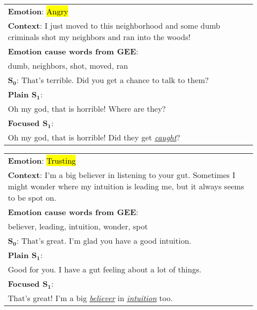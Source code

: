 \documentclass[11pt]{article}
\newcommand{\hlc}[2][yellow]{{\colorlet{foo}{#1}\sethlcolor{foo}\hl{#2}}}
\newcommand{\angry}[1]{\hlc[anger]{#1}}
\newcommand{\sel}[1]{\hlc[selected]{#1}}
\begin{document}
{\renewcommand{\arraystretch}{1.2}
    \begin{table}[t!] \begin{center}
    \small
\begin{tabularx}{\linewidth}{X}
        \toprule
        \textbf{Emotion}: \angry{Angry} \\
        \textbf{Context}:
        I just moved to this neighborhood and some dumb criminals shot my neighbors and ran into the woods! \\
        \midrule
        \textbf{Emotion cause words from GEE}: \\
        dumb, neighbors, shot, moved, ran \\
        \midrule
        \textbf{$\mathbf{S_0}$}: That's terrible. Did you get a chance to talk to them?  \\
        \textbf{Plain $\mathbf{S_1}$}: \\ Oh my god, that is horrible! Where are they? \\
        \textbf{Focused $\mathbf{S_1}$}: \\ Oh my god, that is horrible! Did they get \underline{\textit{caught}}? \\
        \bottomrule
    \end{tabularx}
\begin{tabularx}{\linewidth}{X}
        \toprule
        \textbf{Emotion}: \sel{Trusting} \\
        \textbf{Context}:
        I'm a big believer in listening to your gut. Sometimes I might wonder where my intuition is leading me, but it always seems to be spot on. \\
        \midrule
        \textbf{Emotion cause words from GEE}: \\
        believer, leading, intuition, wonder, spot \\
        \midrule
        \textbf{$\mathbf{S_0}$}: That's great. I'm glad you have a good intuition. \\
        \textbf{Plain $\mathbf{S_1}$}: \\ Good for you. I have a gut feeling about a lot of things. \\
        \textbf{Focused $\mathbf{S_1}$}: \\ That's great! I'm a big \underline{\textit{believer}} in \underline{\textit{intuition}} too. \\
        \bottomrule
    \end{tabularx}
\begin{tabularx}{\linewidth}{X}
        \toprule

\end{tabularx}
\end{center}
\end{table}}
\end{document}
